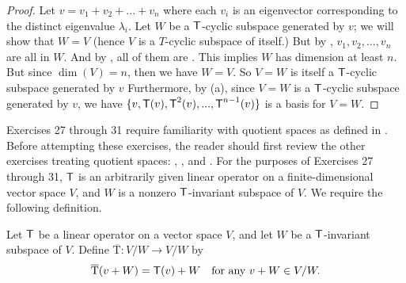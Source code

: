 \begin{proof}
Let \(v = v_1 + v_2 + ... + v_n\) where each \(v_i\) is an eigenvector corresponding to the distinct eigenvalue \(\lambda_i\).
Let \(W\) be a \(\textsf{T}\)-cyclic subspace generated by \(v\); we will show that \(W = V\) (hence \(V\) is a \(T\)-cyclic subspace of itself.)
But by , \(v_1, v_2, ..., v_n\) are all in \(W\).
And by , all of them are \LID{}.
This implies \(W\) has dimension at least \(n\).
But since \(\dim(V) = n\), then we have \(W = V\).
So \(V = W\) is itself a \(\textsf{T}\)-cyclic subspace generated by \(v\)
Furthermore, by (a), since \(V = W\) is a \(\textsf{T}\)-cyclic subspace generated by \(v\), we have \(\{ v, \textsf{T}(v), \textsf{T}^2(v), ..., \textsf{T}^{n - 1}(v) \}\) is a basis for \(V = W\).
\end{proof}

Exercises 27 through 31 require familiarity with quotient spaces as defined in .
Before attempting these exercises, the reader should first review the other exercises treating quotient spaces:
, , and .
For the purposes of Exercises 27 through 31, \(\textsf{T}\) is an arbitrarily given linear operator on a finite-dimensional vector space \(V\), and \(W\) is a nonzero \(\textsf{T}\)-invariant subspace of \(V\).
We require the following definition.

\newcommand{\Tover}{\mathrm{\overline{T}}}

\setcounter{additional definition}{3} %
\begin{additional definition} \label{adef 5.4}
Let \(\textsf{T}\) be a linear operator on a vector space \(V\), and let \(W\) be a \(\textsf{T}\)-invariant subspace of \(V\).
Define \(\Tover: V/W \to V/W\) by
\[
    \Tover(v + W) = \T(v) + W \quad \text{for any } v + W \in V/W. 
\]
\end{additional definition}

